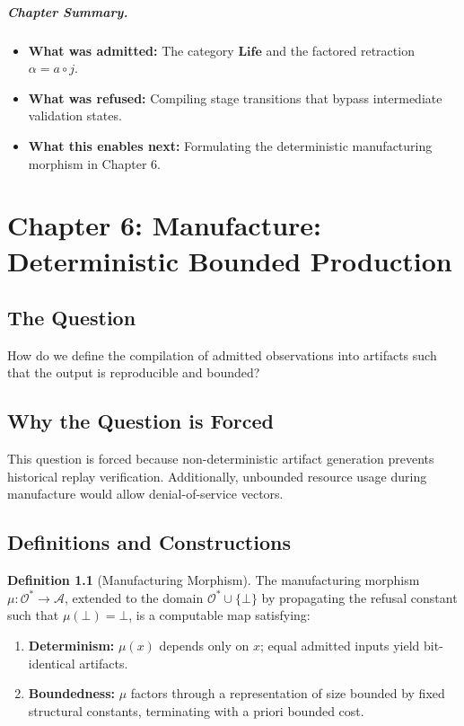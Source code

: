 \documentclass[11pt,oneside]{book}
\theoremstyle{definition}
\newtheorem{definition}{Definition}[chapter]
\theoremstyle{plain}
\theoremstyle{remark}
\newcommand{\Obs}{\mathcal{O}}                 %
\newcommand{\Act}{\mathcal{A}}                 %
\newcommand{\muop}{\mu}                        %
\newcommand{\Rfsl}{\bot}                        %
\newcommand{\Life}{\mathbf{Life}}
\begin{document}
\paragraph{Chapter Summary.}
\begin{itemize}
  \item \textbf{What was admitted:} The category $\Life$ and the factored retraction $\alpha = a \circ j$. %
  \item \textbf{What was refused:} Compiling stage transitions that bypass intermediate validation states. %
  \item \textbf{What this enables next:} Formulating the deterministic manufacturing morphism in Chapter 6. %
\end{itemize}

\chapter{Chapter 6: Manufacture: Deterministic Bounded Production}
\label{ch:manufacture}

\section{The Question}
How do we define the compilation of admitted observations into artifacts such that the output is reproducible and bounded? %

\section{Why the Question is Forced}
This question is forced because non-deterministic artifact generation prevents historical replay verification. %
Additionally, unbounded resource usage during manufacture would allow denial-of-service vectors. %

\section{Definitions and Constructions}

\begin{definition}[Manufacturing Morphism]\label{def:mfg_morphism}
The manufacturing morphism $\muop: \Obs^* \to \Act$, extended to the domain $\Obs^* \cup \{\Rfsl\}$ by propagating the refusal constant such that $\muop(\Rfsl) = \Rfsl$, is a computable map satisfying: %
\begin{enumerate}[label=(M\arabic*),leftmargin=*]
  \item \textbf{Determinism:} $\muop(x)$ depends only on $x$; equal admitted inputs yield bit-identical artifacts. %
  \item \textbf{Boundedness:} $\muop$ factors through a representation of size bounded by fixed structural constants, terminating with a priori bounded cost. %
\end{enumerate}
\end{definition}
\end{document}

